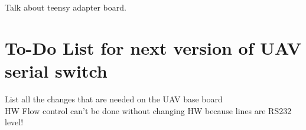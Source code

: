%
Talk about teensy adapter board.
%
\section{To-Do List for next version of UAV serial switch}%
%
List all the changes that are needed on the UAV base board\\
HW Flow control can't be done without changing HW because lines are RS232 level!